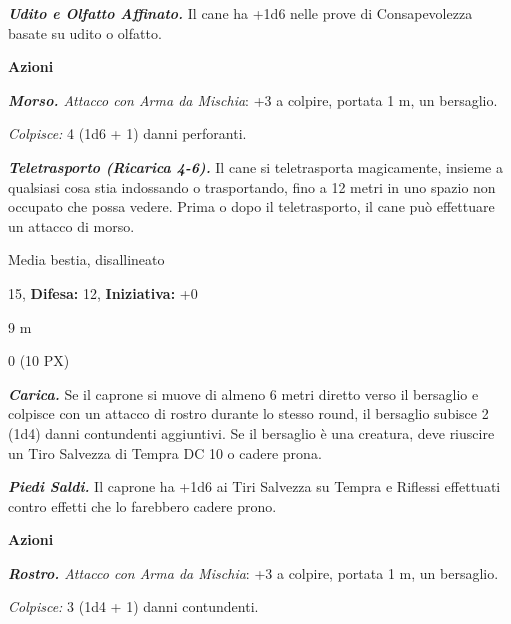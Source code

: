 \begin{multicols}{2}
{\emph{\textbf{Udito e Olfatto Affinato.}} Il cane ha +1d6 nelle prove di Consapevolezza basate su udito o olfatto.

\textbf{Azioni}

\emph{\textbf{Morso.} Attacco con Arma da Mischia}: +3 a colpire, portata 1 m, un bersaglio.

\emph{Colpisce:} 4 (1d6 + 1) danni perforanti.

\emph{\textbf{Teletrasporto (Ricarica 4-6).}} Il cane si teletrasporta magicamente, insieme a qualsiasi cosa stia indossando o trasportando, fino a 12 metri in uno spazio non occupato che possa vedere. Prima o dopo il teletrasporto, il cane può effettuare un attacco di morso.

\begin{description}[noitemsep, topsep=0pt, parsep=0pt, partopsep=0pt, leftmargin=0cm, labelwidth=2.2cm]
	\item[\textbf{Taglia/Tipo:}] Media bestia, disallineato
	\item[\textbf{Caratt.:}] 
	\item[\textbf{Punti Ferita:}] 15,  \textbf{Difesa:} 12,  \textbf{Iniziativa:} +0
	\item[\textbf{Tiri Salvez.:}] 
	\item[\textbf{Movimento:}] 9 m
	\item[\textbf{Sfida:}] 0 (10 PX)\smallskip
\end{description}

\emph{\textbf{Carica.}} Se il caprone si muove di almeno 6 metri diretto verso il bersaglio e colpisce con un attacco di rostro durante lo stesso round, il bersaglio subisce 2 (1d4) danni contundenti aggiuntivi. Se il bersaglio è una creatura, deve riuscire un Tiro Salvezza di Tempra DC 10 o cadere prona.

\emph{\textbf{Piedi Saldi.}} Il caprone ha +1d6 ai Tiri Salvezza su Tempra e Riflessi effettuati contro effetti che lo farebbero cadere prono.

\textbf{Azioni}

\emph{\textbf{Rostro.} Attacco con Arma da Mischia}: +3 a colpire, portata 1 m, un bersaglio.

\emph{Colpisce:} 3 (1d4 + 1) danni contundenti.

}
\end{multicols}

